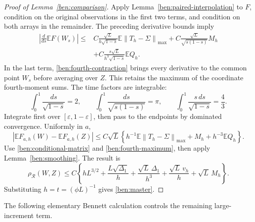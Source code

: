 \documentclass[11pt,letterpaper]{article}
\newenvironment{recovered}{}{}
\theoremstyle{remark}
\newcommand{\E}{\mathbb E}
\newcommand{\norm}[1]{\left\lVert#1\right\rVert}
\newcommand{\rh}{\rho_{\mathcal R}}
\begin{document}
\begin{recovered}
\begin{proof}[Proof of Lemma~\ref{ben:comparison}]
Apply Lemma~\ref{ben:paired-interpolation} to \(F\), condition on
the original observations in the first two terms, and condition on
both arrays in the remainder. The preceding derivative bounds imply
\begin{align*}
 \left|\frac d{ds}\E F(W_s)\right|
 \le{}&C\frac{\sqrt L}{h\sqrt{1-s}}
                \E\norm{T_h-\Sigma}_{\max}
       +C\frac{\sqrt L}{\sqrt{s(1-s)}}M_h\\
 &+C\frac{s\sqrt L}{h^3\sqrt{1-s}}\E Q_h.
\end{align*}
In the last term, \eqref{ben:fourth-contraction} brings every
derivative to the common point \(W_s\) before averaging over \(Z\).
This retains the maximum of the coordinate fourth-moment sums.
The time factors are integrable:
\[
 \int_0^1\frac{ds}{\sqrt{1-s}}=2,\qquad
 \int_0^1\frac{ds}{\sqrt{s(1-s)}}=\pi,\qquad
 \int_0^1\frac{s\,ds}{\sqrt{1-s}}=\frac43.
\]
Integrate first over \([\varepsilon,1-\varepsilon]\), then pass
to the endpoints by dominated convergence. Uniformly in \(a\),
\[
 |\E F_{a,h}(W)-\E F_{a,h}(Z)|
 \le C\sqrt L\left\{
 h^{-1}\E\norm{T_h-\Sigma}_{\max}+M_h+h^{-3}\E Q_h\right\}.
\]
Use \eqref{ben:conditional-matrix} and \eqref{ben:fourth-maximum},
then apply Lemma~\ref{ben:smoothing}. The result is
\[
 \rh(W,Z)\le C\left\{
 hL^{3/2}+\frac{L\sqrt{\Delta_1}}h
 +\frac{\sqrt L\,\Delta_1}{h^3}
 +\frac{\sqrt L\,v_h}h+\sqrt L\,M_h\right\}.
\]
Substituting \(h=t=(\phi L)^{-1}\) gives \eqref{ben:master}.
\end{proof}
\end{recovered}


The following elementary Bennett calculation controls the remaining
large-increment term.
\end{document}
